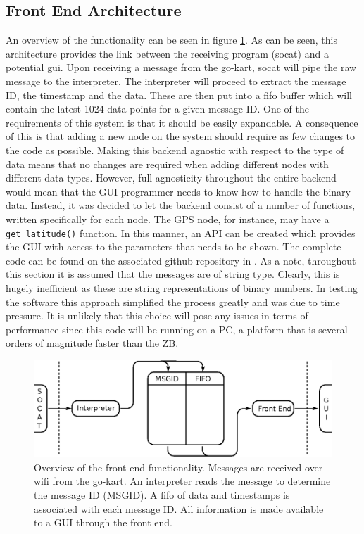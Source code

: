 \subsection{Front End Architecture}\label{sec:frontend}
An overview of the functionality can be seen in figure \ref{fig:backendconcept}.
As can be seen, this architecture provides the link between the receiving program (socat) and a potential \acs{gui}.
Upon receiving a message from the go-kart, socat will pipe the raw message to the interpreter.
The interpreter will proceed to extract the message ID, the timestamp and the data.
These are then put into a fifo buffer which will contain the latest 1024 data points for a given message ID.
One of the requirements of this system is that it should be easily expandable.
A consequence of this is that adding a new node on the system should require as few changes to the code as possible.
Making this backend agnostic with respect to the type of data means that no changes are required when adding different nodes with different data types.
However, full agnosticity throughout the entire backend would mean that the GUI programmer needs to know how to handle the binary data.
Instead, it was decided to let the backend consist of a number of functions, written specifically for each node.
The GPS node, for instance, may have a \texttt{get\_latitude()} function.
In this manner, an API can be created which provides the GUI with access to the parameters that needs to be shown.
The complete code can be found on the associated github repository in .
As a note, throughout this section it is assumed that the messages are of string type.
Clearly, this is hugely inefficient as these are string representations of binary numbers.
In testing the software this approach simplified the process greatly and was due to time pressure.
It is unlikely that this choice will pose any issues in terms of performance since this code will be running on a PC, a platform that is several orders of magnitude faster than the ZB.

\begin{figure}
	\includegraphics[width=\linewidth]{graphics/backend_concept}
	\caption[Overview of the front end functionality.]{Overview of the front end functionality. 
	Messages are received over wifi from the go-kart. 
	An interpreter reads the message to determine the message ID (MSGID). A fifo of data and timestamps is associated with each message ID. 
	All information is made available to a GUI through the front end.}
	\label{fig:backendconcept}
\end{figure}

